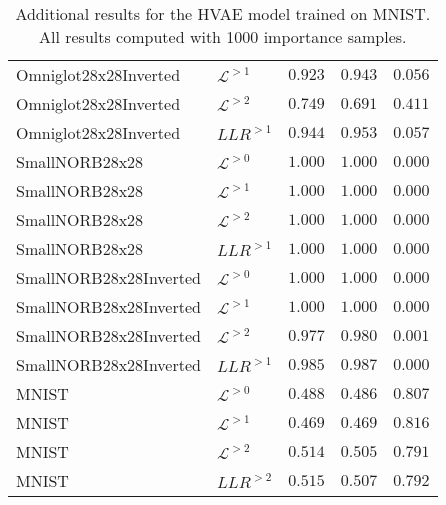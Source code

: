 {\begin{table}[t]
\begin{tabular}{llrrr}
Omniglot28x28Inverted            &  $\mathcal{L}^{>1}$  &  $0.923$  &  $0.943$  &  $0.056$ \\
Omniglot28x28Inverted            &  $\mathcal{L}^{>2}$  &  $0.749$  &  $0.691$  &  $0.411$ \\
Omniglot28x28Inverted          &  $LLR^{>1}$  &  $0.944$  &  $0.953$  &  $0.057$ \\
\midrule
SmallNORB28x28                   &  $\mathcal{L}^{>0}$  &  $1.000$  &  $1.000$  &  $0.000$ \\
SmallNORB28x28                   &  $\mathcal{L}^{>1}$  &  $1.000$  &  $1.000$  &  $0.000$ \\
SmallNORB28x28                   &  $\mathcal{L}^{>2}$  &  $1.000$  &  $1.000$  &  $0.000$ \\
SmallNORB28x28                 &  $LLR^{>1}$  &  $1.000$  &  $1.000$  &  $0.000$ \\
\midrule
SmallNORB28x28Inverted           &  $\mathcal{L}^{>0}$  &  $1.000$  &  $1.000$  &  $0.000$ \\
SmallNORB28x28Inverted           &  $\mathcal{L}^{>1}$  &  $1.000$  &  $1.000$  &  $0.000$ \\
SmallNORB28x28Inverted           &  $\mathcal{L}^{>2}$  &  $0.977$  &  $0.980$  &  $0.001$ \\
SmallNORB28x28Inverted         &  $LLR^{>1}$  &  $0.985$  &  $0.987$  &  $0.000$ \\
\midrule
MNIST                            &  $\mathcal{L}^{>0}$  &  $0.488$  &  $0.486$  &  $0.807$ \\
MNIST                            &  $\mathcal{L}^{>1}$  &  $0.469$  &  $0.469$  &  $0.816$ \\
MNIST                            &  $\mathcal{L}^{>2}$  &  $0.514$  &  $0.505$  &  $0.791$ \\
MNIST                          &  $LLR^{>2}$  &  $0.515$  &  $0.507$  &  $0.792$ \\
         \bottomrule
    \end{tabular}
    \caption[Additional results for the HVAE model trained on MNIST]{Additional results for the HVAE model trained on MNIST. All results computed with 1000 importance samples.}
    \label{tab_hierarchical:additional-results-mnist}
\end{table}
}

